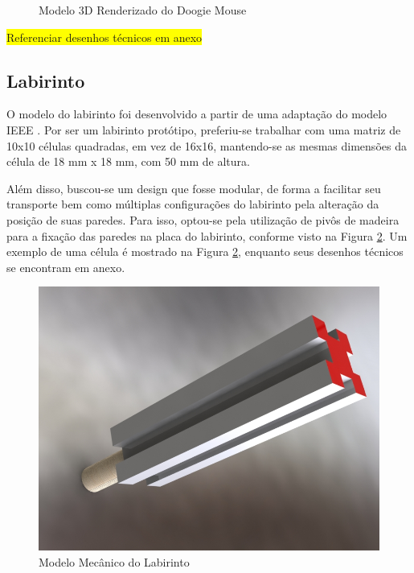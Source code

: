 \begin{figure}[H]
	\centering
	\caption{Modelo 3D Renderizado do Doogie Mouse}
	\label{fig:doogie_boards_3d_render}
\end{figure}

\colorbox{yellow}{Referenciar desenhos técnicos em anexo}

\subsection{Labirinto}
\label{ssec:labirinto}

O modelo do labirinto foi desenvolvido a partir de uma adaptação do modelo IEEE \cite{Wan2019}. Por ser um labirinto protótipo, preferiu-se trabalhar com uma matriz de 10x10 células quadradas, em vez de 16x16, mantendo-se as mesmas dimensões da célula de 18 mm x 18 mm, com 50 mm de altura.

Além disso, buscou-se um design que fosse modular, de forma a facilitar seu transporte bem como múltiplas configurações do labirinto pela alteração da posição de suas paredes. Para isso, optou-se pela utilização de pivôs de madeira para a fixação das paredes na placa do labirinto, conforme visto na Figura \ref{fig:pivo}. Um exemplo de uma célula é mostrado na Figura \ref{fig:pivo}, enquanto seus desenhos técnicos se encontram em anexo.

\begin{figure}[H]
	\centering
	\caption{Modelo Mecânico do Labirinto}
	\label{fig:pivo}\includegraphics[scale=0.2]{Figures/pivo.JPG}
\end{figure}

